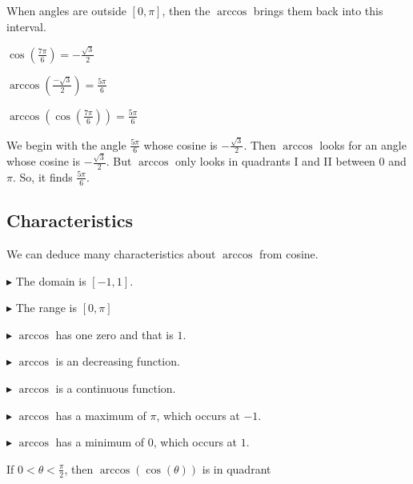 \documentclass{ximera}
\begin{document}
When angles are outside $\left[ 0,\pi \right]$, then the $\arccos$ brings them back into this interval.




\begin{example}



$\cos\left(\frac{7\pi}{6}\right) = -\frac{\sqrt{3}}{2}$

$\arccos\left(\frac{-\sqrt{3}}{2}\right) = \frac{5\pi}{6}$


$\arccos\left(\cos\left(\frac{7\pi}{6}\right)\right) = \frac{5\pi}{6}$




We begin with the angle $\frac{5\pi}{6}$ whose cosine is $-\frac{\sqrt{3}}{2}$.  Then $\arccos$ looks for an angle whose cosine is $-\frac{\sqrt{3}}{2}$.  But $\arccos$ only looks in quadrants I and II between $0$ and $\pi$.  So, it finds $\frac{5\pi}{6}$.


\end{example}











\subsection*{Characteristics} 

We can deduce many characteristics about $\arccos$ from cosine.


$\blacktriangleright$ The domain is  $[-1, 1]$.


$\blacktriangleright$ The range is $[0, \pi]$


$\blacktriangleright$ $\arccos$ has one zero and that is $1$.


$\blacktriangleright$ $\arccos$ is an decreasing function.

$\blacktriangleright$ $\arccos$ is a continuous function.

$\blacktriangleright$ $\arccos$ has a maximum of $\pi$, which occurs at $-1$.

$\blacktriangleright$ $\arccos$ has a minimum of $0$, which occurs at $1$.








\begin{question}


If $0 < \theta < \frac{\pi}{2}$, then $\arccos(\cos(\theta))$ is in quadrant

\begin{multipleChoice}
\end{multipleChoice}

\end{question}
\end{document}
